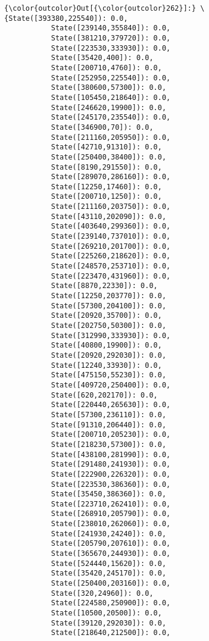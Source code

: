 \documentclass[11pt]{article}
\begin{document}
\begin{Verbatim}[commandchars=\\\{\}]
{\color{outcolor}Out[{\color{outcolor}262}]:} \{State([393380,225540]): 0.0,
           State([239140,355840]): 0.0,
           State([381210,379720]): 0.0,
           State([223530,333930]): 0.0,
           State([35420,400]): 0.0,
           State([200710,4760]): 0.0,
           State([252950,225540]): 0.0,
           State([380600,57300]): 0.0,
           State([105450,218640]): 0.0,
           State([246620,19900]): 0.0,
           State([245170,235540]): 0.0,
           State([346900,70]): 0.0,
           State([211160,205950]): 0.0,
           State([42710,91310]): 0.0,
           State([250400,38400]): 0.0,
           State([8190,291550]): 0.0,
           State([289070,286160]): 0.0,
           State([12250,17460]): 0.0,
           State([200710,1250]): 0.0,
           State([211160,203750]): 0.0,
           State([43110,202090]): 0.0,
           State([403640,299360]): 0.0,
           State([239140,737010]): 0.0,
           State([269210,201700]): 0.0,
           State([225260,218620]): 0.0,
           State([248570,253710]): 0.0,
           State([223470,431960]): 0.0,
           State([8870,22330]): 0.0,
           State([12250,203770]): 0.0,
           State([57300,204100]): 0.0,
           State([20920,35700]): 0.0,
           State([202750,50300]): 0.0,
           State([312990,333930]): 0.0,
           State([40800,19900]): 0.0,
           State([20920,292030]): 0.0,
           State([12240,33930]): 0.0,
           State([475150,55230]): 0.0,
           State([409720,250400]): 0.0,
           State([620,202170]): 0.0,
           State([220440,265630]): 0.0,
           State([57300,236110]): 0.0,
           State([91310,206440]): 0.0,
           State([200710,205230]): 0.0,
           State([218230,57300]): 0.0,
           State([438100,281990]): 0.0,
           State([291480,241930]): 0.0,
           State([222900,226320]): 0.0,
           State([223530,386360]): 0.0,
           State([35450,386360]): 0.0,
           State([223710,262410]): 0.0,
           State([268910,205790]): 0.0,
           State([238010,262060]): 0.0,
           State([241930,24240]): 0.0,
           State([205790,207610]): 0.0,
           State([365670,244930]): 0.0,
           State([524440,15620]): 0.0,
           State([35420,245170]): 0.0,
           State([250400,203160]): 0.0,
           State([320,24960]): 0.0,
           State([224580,250900]): 0.0,
           State([10500,20500]): 0.0,
           State([39120,292030]): 0.0,
           State([218640,212500]): 0.0,

\end{Verbatim}
\end{document}
